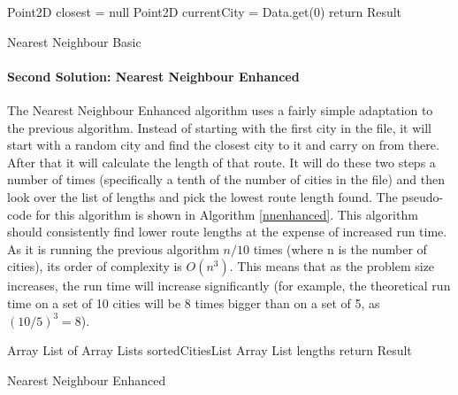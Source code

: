 \documentclass[conference,backref=page]{acmsiggraph}
\begin{document}
\begin{algorithm}[h]
	Point2D closest = null\;
	Point2D currentCity = Data.get(0)\;
	return Result\;
	\caption{Nearest Neighbour Basic}
	\label{nnbasic}
\end{algorithm}

\paragraph{Second Solution: Nearest Neighbour Enhanced}
The Nearest Neighbour Enhanced algorithm uses a fairly simple adaptation to the previous algorithm. Instead of starting with the first city in the file, it will start with a random city and find the closest city to it and carry on from there. After that it will calculate the length of that route. It will do these two steps a number of times (specifically a tenth of the number of cities in the file) and then look over the list of lengths and pick the lowest route length found. The pseudo-code for this algorithm is shown in Algorithm \ref{nnenhanced}. This algorithm should consistently find lower route lengths at the expense of increased run time. As it is running the previous algorithm $n/10$ times (where n is the number of cities), its order of complexity is $O(n^3)$. This means that as the problem size increases, the run time will increase significantly (for example, the theoretical run time on a set of 10 cities will be 8 times bigger than on a set of 5, as $(10/5)^3 = 8$).

\begin{algorithm}[h]
	Array List of Array Lists sortedCitiesList\;
	Array List lengths\;
	return Result\;
	\caption{Nearest Neighbour Enhanced}
	\label{nnenhanced}
\end{algorithm}
\end{document}
